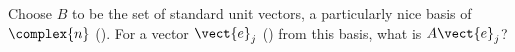 Choose $B$ to be the set of standard unit vectors, a particularly nice basis of $\complex{n}$ ().  For a vector $\vect{e}_j$ () from this basis, what is $A\vect{e}_j$?